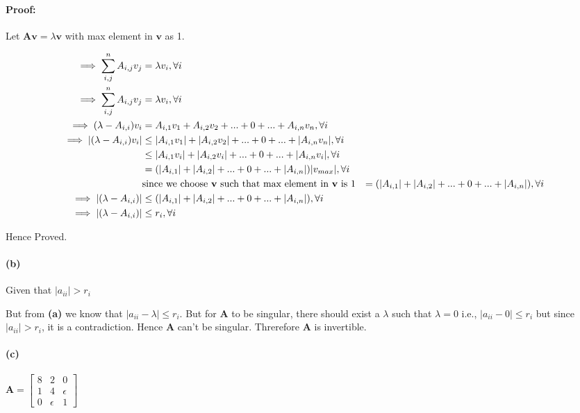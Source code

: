 \documentclass[12pt, letterpaper]{article}
\begin{document}
\paragraph{Proof:}
Let $\mathbf{A}\mathbf{v} = \lambda \mathbf{v}$ with max element in $\mathbf{v}$ as 1.

\begin{align*}
  \implies \sum_{i,j}^n A_{i, j}v_j &= \lambda v_i, \forall i \\
  \implies \sum_{i,j}^n A_{i, j}v_j &= \lambda v_i, \forall i \\
  \implies (\lambda - A_{i,i})v_i &= A_{i,1}v_1 + A_{i,2}v_2 + ... + 0 + ... + A_{i,n}v_n, \forall i \\
  \implies |(\lambda - A_{i,i})v_i| &\leq |A_{i,1}v_1| + |A_{i,2}v_2| + ... + 0 + ... + |A_{i,n}v_n|, \forall i \\
  &\leq |A_{i,1}v_i| + |A_{i,2}v_i| + ... + 0 + ... + |A_{i,n}v_i|, \forall i \\
  &= (|A_{i,1}| + |A_{i,2}| + ... + 0 + ... + |A_{i,n}|)|v_{max}|, \forall i \\
  &\text{since we choose \textbf{v} such that max element in $\mathbf{v}$ is 1}
  &= (|A_{i,1}| + |A_{i,2}| + ... + 0 + ... + |A_{i,n}|), \forall i \\
  \implies |(\lambda - A_{i,i})| &\leq (|A_{i,1}| + |A_{i,2}| + ... + 0 + ... + |A_{i,n}|), \forall i \\
  \implies |(\lambda - A_{i,i})| &\leq r_i, \forall i \\
\end{align*}

Hence Proved.

\paragraph{(b)} Given that $|a_{ii}| > r_i$

But from \textbf{(a)} we know that $|a_{ii} - \lambda| \leq r_i$. But for $\mathbf{A}$ to be singular, there should exist a $\lambda$ such that $\lambda = 0$ i.e., $|a_{ii} - 0| \leq r_i$ but since $|a_{ii}| > r_i$, it is a contradiction. Hence $\mathbf{A}$ can't be singular. Threrefore $\mathbf{A}$ is invertible.

\paragraph{(c)} $\mathbf{A} =
\begin{bmatrix} 
  8 & 2 & 0 \\ 1 & 4 & \epsilon \\ 0 & \epsilon & 1
\end{bmatrix}$\\
\end{document}
